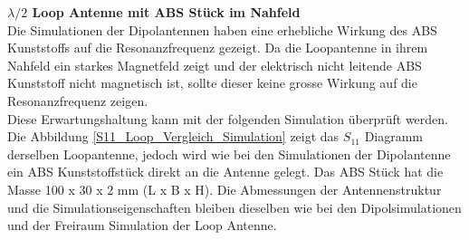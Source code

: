 
\textbf{$\lambda/2$ Loop Antenne mit ABS Stück im Nahfeld}\\
Die Simulationen der Dipolantennen haben eine erhebliche Wirkung des ABS Kunststoffs auf die Resonanzfrequenz gezeigt. Da die Loopantenne in ihrem Nahfeld ein starkes Magnetfeld zeigt und der elektrisch nicht leitende ABS Kunststoff nicht magnetisch ist, sollte dieser keine grosse Wirkung auf die Resonanzfrequenz zeigen.\\ Diese Erwartungshaltung kann mit der folgenden Simulation überprüft werden.\\
 
Die Abbildung \ref{S11_Loop_Vergleich_Simulation} zeigt das $S_{11}$ Diagramm derselben Loopantenne, jedoch wird wie bei den Simulationen der Dipolantenne ein ABS Kunststoffstück direkt an die Antenne gelegt. Das ABS Stück hat die Masse 100 x 30 x 2 mm (L x B x H). Die Abmessungen der Antennenstruktur und die Simulationseigenschaften bleiben dieselben wie bei den Dipolsimulationen und der Freiraum Simulation der Loop Antenne.\\


